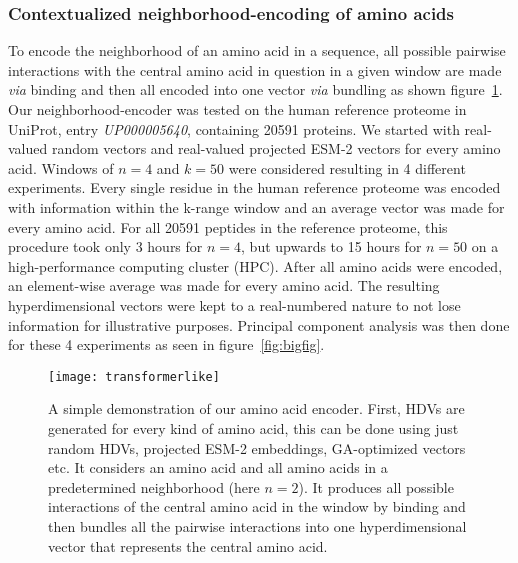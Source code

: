 \subsubsection*{Contextualized neighborhood-encoding of amino acids}\label{sssec:trans}
To encode the neighborhood of an amino acid in a sequence, all possible pairwise interactions with the central amino acid in question in a given window are made \textit{via} binding and then all encoded into one vector \textit{via} bundling as shown figure~\ref{fig:AAtr}. Our neighborhood-encoder was tested on the human reference proteome in UniProt, entry \textit{UP000005640}, containing 20591 proteins. We started with real-valued random vectors and real-valued projected ESM-2 vectors for every amino acid. Windows of $n = 4$ and $k = 50$ were considered resulting in 4 different experiments. Every single residue in the human reference proteome was encoded with information within the k-range window and an average vector was made for every amino acid. For all 20591 peptides in the reference proteome, this procedure took only 3 hours for $n = 4$, but upwards to 15 hours for $n = 50$ on a high-performance computing cluster (HPC). After all amino acids were encoded, an element-wise average was made for every amino acid. The resulting hyperdimensional vectors were kept to a real-numbered nature to not lose information for illustrative purposes. Principal component analysis was then done for these 4 experiments as seen in figure~\ref{fig:bigfig}. 

\begin{figure}[H]
    \centering
    \texttt{[image: transformerlike]}
    \caption{A simple demonstration of our amino acid encoder. First, HDVs are generated for every kind of amino acid, this can be done using just random HDVs, projected ESM-2 embeddings, GA-optimized vectors etc. It considers an amino acid and all amino acids in a predetermined neighborhood (here $n = 2$). It produces all possible interactions of the central amino acid in the window by binding and then bundles all the pairwise interactions into one hyperdimensional vector that represents the central amino acid.}\label{fig:AAtr}
\end{figure}

